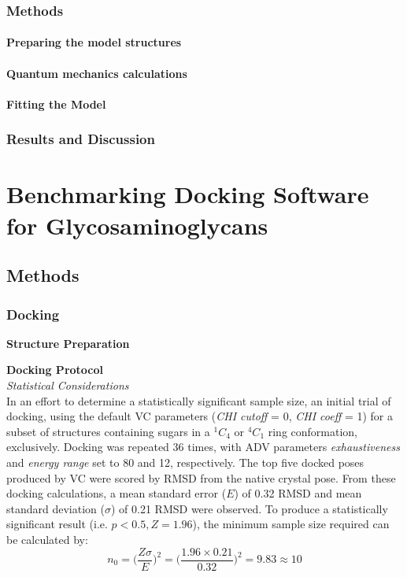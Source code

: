 \documentclass[a4paper, 12pt, openany]{book}
\begin{document}
\subsection{Methods}
\subsubsection*{Preparing the model structures}


\subsubsection*{Quantum mechanics calculations}


\subsubsection*{Fitting the Model}

\subsection{Results and Discussion}


\chapter{Benchmarking Docking Software for Glycosaminoglycans}

\section{Methods}
\subsection{Docking}
\noindent \textbf{Structure Preparation}

\noindent \textbf{Docking Protocol}\\
\noindent \textit{Statistical Considerations}\\
In an effort to determine a statistically significant sample size, an initial trial of docking, using the default \ac{VC} parameters (\textit{CHI cutoff} = 0, \textit{CHI coeff} = 1) for a subset of structures containing sugars in a $^{1}C_{4}$ or $^{4}C_{1}$ ring conformation, exclusively. Docking was repeated 36 times, with \ac{ADV} parameters \textit{exhaustiveness} and \textit{energy range} set to 80 and 12, respectively. The top five docked poses produced by \ac{VC} were scored by \ac{RMSD} from the native crystal pose. From these docking calculations, a mean standard error ($E$) of 0.32 \ac{RMSD} and mean standard deviation ($\sigma$) of 0.21 \ac{RMSD} were observed. To produce a statistically significant result (i.e. $p < 0.5, Z = 1.96$), the minimum sample size required can be calculated by:
\begin{equation}  \label{eq:statistical_considerations}
   n_{0} = \Big(\frac{Z \sigma}{E}\Big)^{2} = \Big(\frac{1.96 \times 0.21}{0.32}\Big)^{2} = 9.83 \approx 10 
\end{equation}
\\
\\
\end{document}
